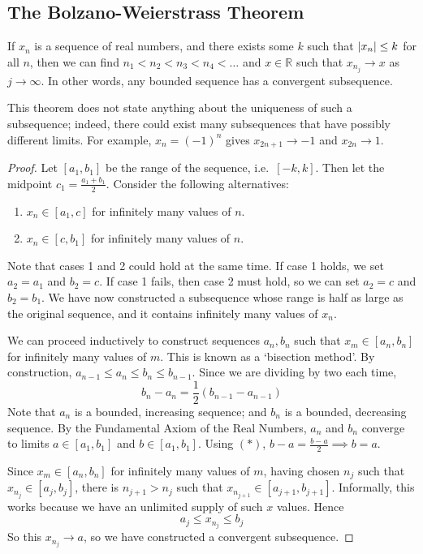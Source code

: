 \subsection{The Bolzano-Weierstrass Theorem}
\begin{theorem}
	If \(x_n\) is a sequence of real numbers, and there exists some \(k\) such that \(\abs{x_n} \leq k\) for all \(n\), then we can find \(n_1 < n_2 < n_3 < n_4 < \dots\) and \(x \in \mathbb R\) such that \(x_{n_j} \to x\) as \(j \to \infty\). In other words, any bounded sequence has a convergent subsequence.
\end{theorem}
\begin{remark}
	This theorem does not state anything about the uniqueness of such a subsequence; indeed, there could exist many subsequences that have possibly different limits. For example, \(x_n = (-1)^n\) gives \(x_{2n+1} \to -1\) and \(x_{2n} \to 1\).
\end{remark}
\begin{proof}
	Let \([a_1, b_1]\) be the range of the sequence, i.e.\ \([-k, k]\). Then let the midpoint \(c_1 = \frac{a_1 + b_1}{2}\). Consider the following alternatives:
	\begin{enumerate}
		\item \(x_n \in [a_1, c]\) for infinitely many values of \(n\).
		\item \(x_n \in [c, b_1]\) for infinitely many values of \(n\).
	\end{enumerate}
	Note that cases 1 and 2 could hold at the same time. If case 1 holds, we set \(a_2 = a_1\) and \(b_2 = c\). If case 1 fails, then case 2 must hold, so we can set \(a_2 = c\) and \(b_2 = b_1\). We have now constructed a subsequence whose range is half as large as the original sequence, and it contains infinitely many values of \(x_n\).

	We can proceed inductively to construct sequences \(a_n, b_n\) such that \(x_m \in [a_n, b_n]\) for infinitely many values of \(m\). This is known as a `bisection method'. By construction, \(a_{n-1} \leq a_n \leq b_n \leq b_{n-1}\). Since we are dividing by two each time,
	\[ b_n - a_n = \frac{1}{2}(b_{n-1} - a_{n-1}) \tag{\(\ast\)} \]
	Note that \(a_n\) is a bounded, increasing sequence; and \(b_n\) is a bounded, decreasing sequence. By the Fundamental Axiom of the Real Numbers, \(a_n\) and \(b_n\) converge to limits \(a \in [a_1, b_1]\) and \(b \in [a_1, b_1]\). Using \((\ast)\), \(b-a = \frac{b-a}{2} \implies b = a\).

	Since \(x_m \in [a_n, b_n]\) for infinitely many values of \(m\), having chosen \(n_j\) such that \(x_{n_j} \in [a_j, b_j]\), there is \(n_{j+1} > n_j\) such that \(x_{n_{j+1}} \in [a_{j+1}, b_{j+1}]\). Informally, this works because we have an unlimited supply of such \(x\) values. Hence
	\[ a_j \leq x_{n_j} \leq b_j \]
	So this \(x_{n_j} \to a\), so we have constructed a convergent subsequence.
\end{proof}

